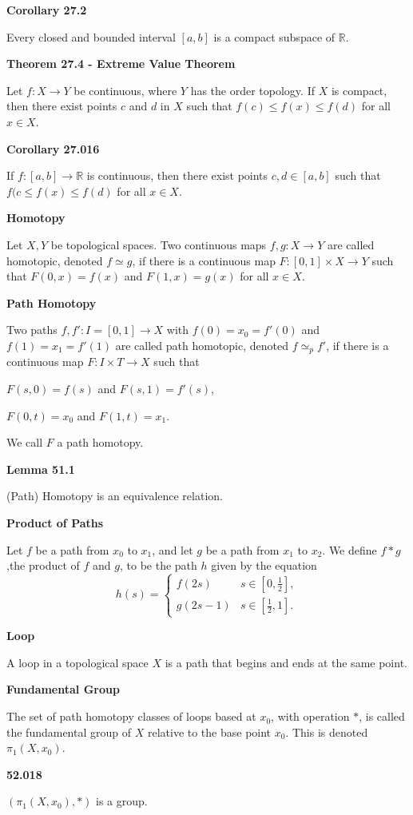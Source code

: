 \documentclass{article}
\begin{document}
\medskip\noindent\textbf{Corollary 27.2}

    Every closed and bounded interval $[a,b]$ is a compact subspace of $\mathbb R$.

\medskip\noindent\textbf{Theorem 27.4 - Extreme Value Theorem}

    Let $f: X \to Y$ be continuous, where $Y$ has the order topology. If $X$ is compact, then there exist points $c$ and $d$ in $X$ such that $f(c) \leq f(x) \leq f(d)$ for all $x \in X$.

\medskip\noindent\textbf{Corollary 27.016}

    If $f: [a,b] \to \mathbb R$ is continuous, then there exist points $c,d \in [a,b]$ such that $f(c \leq f(x) \leq f(d)$ for all $x \in X$.

\medskip\noindent\textbf{Homotopy}

    Let $X, Y$ be topological spaces.
    Two continuous maps $f,g:X \to Y$ are called homotopic, denoted $f \simeq g$, if there is a continuous map $F: [0,1] \times X \to Y$ such that $F(0,x) = f(x)$ and $F(1, x) = g(x)$ for all $x \in X$.

\medskip\noindent\textbf{Path Homotopy}

    Two paths $f, f': I=[0,1] \to X$ with $f(0) = x_0 = f'(0)$ and $f(1) = x_1 = f'(1)$ are called path homotopic, denoted $f \simeq_{p} f'$, if there is a continuous map $F: I \times T \to X$ such that 
    \begin{center}
        $F(s, 0) = f(s)$ and $F(s,1) = f'(s)$,

        $F(0, t) = x_0$ and $F(1, t) = x_1$.
    \end{center}

    We call $F$ a path homotopy.

\medskip\noindent\textbf{Lemma 51.1}

    (Path) Homotopy is an equivalence relation.

\medskip\noindent\textbf{Product of Paths}

    Let $f$ be a path from $x_0$ to $x_1$, and let $g$ be a path from $x_1$ to $x_2$.
    We define $f * g$,the product of $f$ and $g$, to be the path $h$ given by the equation $$h(s) = \begin{cases} f(2s) & s \in [0, \frac12], \\ g(2s-1) & s \in [\frac12, 1]. \end{cases}$$

\medskip\noindent\textbf{Loop}

    A loop in a topological space $X$ is a path that begins and ends at the same point.

\medskip\noindent\textbf{Fundamental Group}

    The set of path homotopy classes of loops based at $x_0$, with operation $*$, is called the fundamental group of $X$ relative to the base point $x_0$. This is denoted $\pi_1(X,x_0)$.

\medskip\noindent\textbf{52.018}

    $(\pi_1(X,x_0), *)$ is a group.
\end{document}
